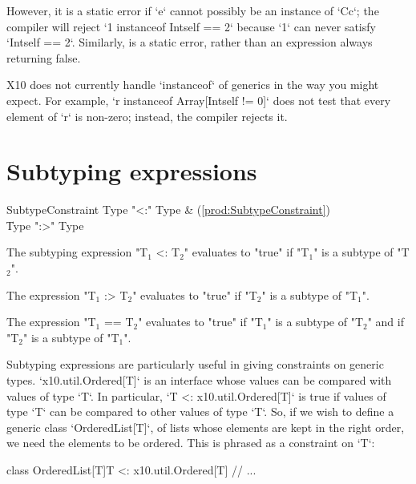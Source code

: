 However, it is a static error if \xcd`e` cannot possibly be an instance of
\xcd`C{c}`; the compiler will reject \xcd`1 instanceof Int{self == 2}` because
\xcd`1` can never satisfy \xcd`Int{self == 2}`. Similarly,  is a static error, rather than an expression always returning false. 

\limitationx
X10 does not currently handle \xcd`instanceof` of generics in the way you
might expect.  For example, \xcd`r instanceof Array[Int{self != 0}]` does
not test that every element of \xcd`r` is non-zero; instead, the compiler
rejects it.


\section{Subtyping expressions}
\index{\Xcd{<:}}
\index{\Xcd{:>}}


\begin{bbgrammar}
   SubtypeConstraint \: Type  \xcd"<:" Type  & (\ref{prod:SubtypeConstraint}) \\
                    \| Type  \xcd":>" Type  \\
\end{bbgrammar}

The subtyping expression \xcdmath"T$_1$ <: T$_2$" evaluates to \xcd"true" if
\xcdmath"T$_1$" is a subtype of \xcdmath"T$_2$".

The expression \xcdmath"T$_1$ :> T$_2$" evaluates to \xcd"true" if
\xcdmath"T$_2$" is a subtype of \xcdmath"T$_1$".

The expression \xcdmath"T$_1$ == T$_2$"
evaluates to  \xcd"true" if 
\xcdmath"T$_1$" is a subtype of \xcdmath"T$_2$" and
if \xcdmath"T$_2$" is a subtype of \xcdmath"T$_1$".

\begin{ex}
Subtyping expressions are particularly useful in giving constraints on generic
types.  \xcd`x10.util.Ordered[T]` is an interface whose values can be compared
with values of type \xcd`T`. 
In particular, \xcd`T <: x10.util.Ordered[T]` is
true if values of type \xcd`T` can be compared to other values of type
\xcd`T`.  So, if we wish to define a generic class \xcd`OrderedList[T]`, of
lists whose elements are kept in the right order, we need the elements to be
ordered.  This is phrased as a constraint on \xcd`T`: 
\begin{xten}
class OrderedList[T]{T <: x10.util.Ordered[T]} {
  // ...
}
\end{xten}
%
\end{ex}


